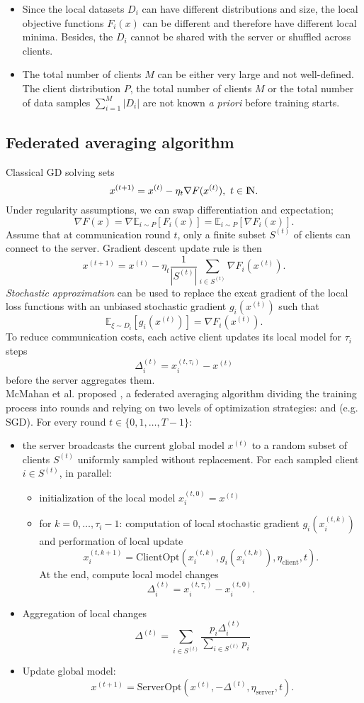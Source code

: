\documentclass[10pt,a4paper]{book}
\theoremstyle{definition}
\theoremstyle{plain}
\theoremstyle{remark}
\newcommand \Esp {\mathbb{E}}
\def\N{{\rm I\kern-0.16em N}}
\begin{document}
\begin{itemize}
\item Since the local datasets $D_i$ can have different distributions and size, the local objective functions $F_i(x)$ can be different and therefore have different local minima. Besides, the $D_i$ cannot be shared with the server or shuffled across clients.
\item The total number of clients $M$ can be either very large and not well-defined. The client distribution $P$, the total number of clients $M$ or the total number of data samples $\sum_{i=1}^{M}|D_i|$ are not known \emph{a priori} before training starts.
\end{itemize}

\subsection{Federated averaging algorithm}Classical GD solving sets
$$x^{(t+1)}=x^{(t)}-\eta_t\nabla F(x^{(t)}),~t\in \N.$$
Under regularity assumptions, we can swap differentiation and expectation;
$$\nabla F(x)=\nabla \Esp_{i\sim P}[F_i(x)]=\Esp_{i\sim P}[\nabla F_i(x)].$$
Assume that at communication round $t$, only a finite subset $S^{(t)}$ of clients can connect to the server. Gradient descent update rule is then
$$x^{(t+1)}=x^{(t)}-\eta_t \frac{1}{|S^{(t)}|}\sum_{i\in S^{(t)}}\nabla F_i(x^{(t)}).$$
\emph{Stochastic approximation} can be used to replace the excat gradient of the local loss functions with an unbiased stochastic gradient $g_i(x^{(t)})$ such that
$$\Esp_{\xi \sim D_i}[g_i(x^{(t)})]=\nabla F_i(x^{(t)}).$$
To reduce communication costs, each active client updates its local model for $\tau_i$ steps 
$$\Delta_i^{(t)}=x_i^{(t,\tau_i)}-x^{(t)}$$
before the server aggregates them.\\
McMahan et al. proposed , a federated averaging algorithm dividing the training process into rounds and relying on two levels of optimization strategies:  and  (e.g. SGD). For every round $t\in \{0,1,\dots, T-1\}$:
\begin{itemize}
\item the server broadcasts the current global model $x^{(t)}$ to a random subset of clients $S^{(t)}$ uniformly sampled without replacement. For each sampled client $i\in S^{(t)}$, in parallel:
\begin{itemize}
\item initialization of the local model $x_i^{(t,0)}=x^{(t)}$
\item for $k=0,\dots, \tau_i-1$: computation of local stochastic gradient $g_i(x_i^{(t,k)})$ and performation of local update
$$x_i^{(t,k+1)}=\text{ClientOpt}(x_i^{(t,k)},g_i(x_i^{(t,k)}),\eta_{\text{client}},t).$$
At the end, compute local model changes
$$\Delta_i^{(t)}=x_i^{(t,\tau_i)}-x_i^{(t,0)}.$$
\end{itemize}
\item Aggregation of local changes
$$\Delta^{(t)}=\sum_{i\in S^{(t)}}\frac{p_i \Delta_i^{(t)}}{\sum_{i\in S^{(t)}}p_i}$$
\item Update global model: $$x^{(t+1)}=\text{ServerOpt}(x^{(t)},-\Delta^{(t)},\eta_{\text{server}},t).$$
\end{itemize}
\end{document}
